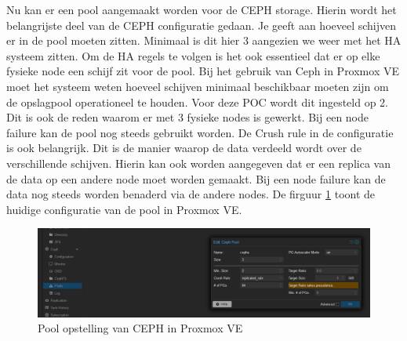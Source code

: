 Nu kan er een pool aangemaakt worden voor de CEPH storage. Hierin wordt het belangrijste deel van de CEPH configuratie gedaan.
Je geeft aan hoeveel schijven er in de pool moeten zitten. Minimaal is dit hier 3 aangezien we weer met het HA systeem zitten. Om de HA regels te volgen is het ook essentieel dat er op elke fysieke node een schijf zit voor de pool.
Bij het gebruik van Ceph in Proxmox VE moet het systeem weten hoeveel schijven minimaal beschikbaar moeten zijn om de opslagpool operationeel te houden. Voor deze POC wordt dit ingesteld op 2. Dit is ook de reden waarom er met 3 fysieke nodes is gewerkt. Bij een node failure kan de pool nog steeds gebruikt worden.
De Crush rule in de configuratie is ook belangrijk. Dit is de manier waarop de data verdeeld wordt over de verschillende schijven. Hierin kan ook worden aangegeven dat er een replica van de data op een andere node moet worden gemaakt. Bij een node failure kan de data nog steeds worden benaderd via de andere nodes.
De firguur \ref{fig:ceph-pool-prox} toont de huidige configuratie van de pool in Proxmox VE.
\begin{figure}[H]
  \centering
  \includegraphics[width=1.1\textwidth]{../poc/ceph-pool-prox.png}
  \caption{Pool opstelling van CEPH in Proxmox VE}
  \label{fig:ceph-pool-prox}
\end{figure}

